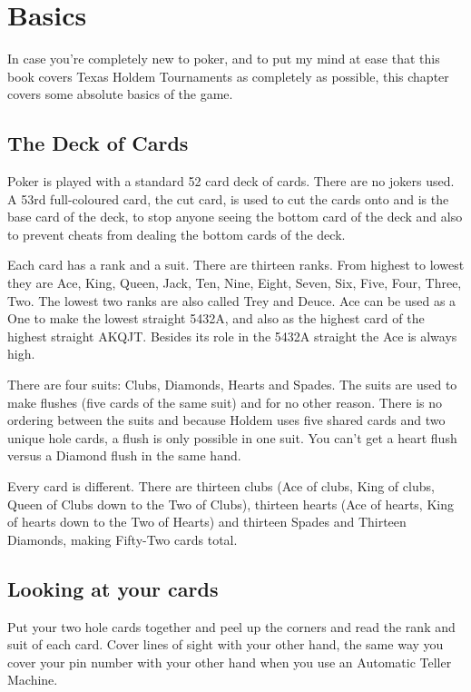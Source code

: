 \chapter{Basics}

In case you're completely new to poker, and to put my mind at ease
that this book covers Texas Holdem Tournaments as completely as
possible, this chapter covers some absolute basics of the game.

\section{The Deck of Cards}

Poker is played with a standard 52 card deck of cards. There are no
jokers used. A 53rd full-coloured card, the cut card, is used to cut
the cards onto and is the base card of the deck, to stop anyone
seeing the bottom card of the deck and also to prevent cheats from
dealing the bottom cards of the deck.

Each card has a rank and a suit. There are thirteen ranks. From
highest to lowest they are Ace, King, Queen, Jack, Ten, Nine, Eight,
Seven, Six, Five, Four, Three, Two. The lowest two ranks are also
called Trey and Deuce. Ace can be used as a One to make
the lowest straight 5432A, and also as the highest card of the highest
straight AKQJT. Besides its role in the 5432A straight the Ace is
always high.

There are four suits: Clubs, Diamonds, Hearts and Spades. The suits
are used to make flushes (five cards of the same suit) and for no
other reason. There is no ordering between the suits and because
Holdem uses five shared cards and two unique hole cards, a flush is
only possible in one suit. You can't get a heart flush versus a
Diamond flush in the same hand.

Every card is different. There are thirteen clubs (Ace of clubs, King
of clubs, Queen of Clubs down to the Two of Clubs), thirteen hearts
(Ace of hearts, King of hearts down to the Two of Hearts) and
thirteen Spades and Thirteen Diamonds, making Fifty-Two cards total.

\section{Looking at your cards}

Put your two hole cards together and peel up the corners and read the
rank and suit of each card. Cover lines of sight with your other hand,
the same way you cover your pin number with your other hand when you
use an Automatic Teller Machine.

